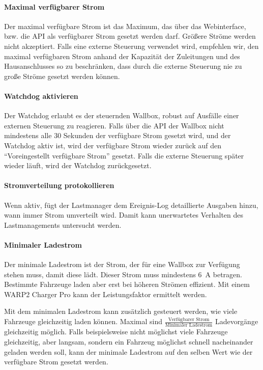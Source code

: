 \documentclass[a4paper,10pt]{article}
\begin{document}
\begin{multicols*}{2}
	\paragraph{Maximal verfügbarer Strom}
	Der maximal verfügbare Strom ist das Maximum, das über das Webinterface, bzw. die API als verfügbarer Strom gesetzt werden darf.
	Größere Ströme werden nicht akzeptiert. Falls eine externe Steuerung verwendet wird, empfehlen wir, den maximal verfügbaren Strom
	anhand der Kapazität der Zuleitungen und des Hausanschlusses so zu beschränken, dass durch die externe Steuerung nie zu große
	Ströme gesetzt werden können.

	\paragraph{Watchdog aktivieren}
	Der Watchdog erlaubt es der steuernden Wallbox, robust auf Ausfälle einer externen Steuerung zu reagieren. Falls über die API der Wallbox
	nicht mindestens alle 30 Sekunden der verfügbare Strom gesetzt wird, und der Watchdog aktiv ist, wird der verfügbare Strom wieder zurück auf den
	\enquote{Voreingestellt verfügbare Strom} gesetzt. Falls die externe Steuerung später wieder läuft, wird der Watchdog zurückgesetzt.

	\paragraph{Stromverteilung protokollieren}
	Wenn aktiv, fügt der Lastmanager dem Ereignis-Log detaillierte Ausgaben hinzu, wann immer Strom umverteilt wird. Damit kann unerwartetes Verhalten des
	Lastmanagements untersucht werden.

	\paragraph{Minimaler Ladestrom}
	Der minimale Ladestrom ist der Strom, der für eine Wallbox zur Verfügung stehen muss, damit diese lädt. Dieser Strom muss mindestens \SI{6}{\ampere} betragen.
	Bestimmte Fahrzeuge laden aber erst bei höheren Strömen effizient. Mit einem WARP2 Charger Pro kann der Leistungsfaktor ermittelt werden.

	Mit dem minimalen Ladestrom kann zusätzlich gesteuert werden, wie viele Fahrzeuge gleichzeitig laden können.
	Maximal sind $\frac{\text{Verfügbarer Strom}}{\text{Minimaler Ladestrom}}$ Ladevorgänge gleichzeitig möglich. Falls beispielsweise nicht möglichst viele
	Fahrzeuge gleichzeitig, aber langsam, sondern ein Fahrzeug möglichst schnell nacheinander geladen werden soll, kann der minimale Ladestrom auf den selben Wert
	wie der verfügbare Strom gesetzt werden.


\end{multicols*}
\end{document}

